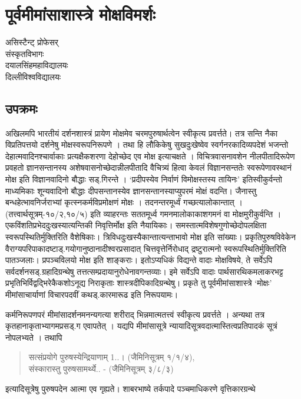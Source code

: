 \chapter{पूर्वमीमांसाशास्त्रे मोक्षविमर्शः}

\begin{center}
\smallskip

असिस्टैन्ट् प्रोफेसर्\\
संस्कृतविभागः\\
दयालसिंहमहाविद्यालयः\\
दिल्लीविश्वविद्यालयः
\addrule
\end{center}
 
\section*{उपक्रमः}

अखिलमपि भारतीयं दर्शनशास्त्रं प्रायेण मोक्षमेव चरमपुरुषार्थत्वेन स्वीकृत्य प्रवर्त्तते। तत्र सन्ति नैका विप्रतिपत्तयो दर्शनेषु मोक्षस्वरूपनिरूपणे । तथा हि लौकिकेषु सुखदुःखेष्वेव स्वर्गनरकादिव्यपदेशं भजन्तो देहात्मवादिनश्चार्वाकाः प्रत्यक्षैकशरणा देहोच्छेद एव मोक्ष इत्याचक्षते । विचित्रवासनावशेन नीलपीतादिरूपेण प्रवहतो ज्ञानसन्तानस्य अशेषवासनोच्छेदान्नीलपीतादि वैचित्र्यं हित्वा केवलं विज्ञानसन्ततेः स्वरूपेणावस्थानं मोक्ष इति विज्ञानवादिनो बौद्धाः सड्.गिरन्ते । ‘प्रदीपस्येव निर्वाणं विमोक्षस्तस्य तायिनः’ इतिस्वीकुर्वन्तो माध्यमिकाः शून्यवादिनो बौद्धाः दीपसन्तानस्येव ज्ञानसन्तानस्याप्युपरमं मोक्षं वदन्ति। जैनास्तु  बन्धहेत्भावनिर्जराभ्यां कृत्स्नकर्मविप्रमोक्षणं मोक्षः । तदनन्तरमूर्ध्वं गच्छत्यालोकान्तात् । (तत्त्वार्थसूत्रम्-१०/२,१०/५) इति व्याहरन्तः सततमूर्ध्व गमनमालोकाकाशगमनं वा मोक्षमुरीकुर्वन्ति । एकविंशतिप्रभेददुःखस्यात्यन्तिकी निवृत्तिर्मोक्ष इति नैयायिकाः। समस्तात्मविशेषगुणोच्छेदोपलक्षिता स्वरूपस्थितिर्मुक्तिरिति वैशेषिकाः। त्रिविधदुःखस्यैकान्तात्यन्ताभावो मोक्ष इति सांख्याः। प्रकृतिपुरुषविवेकेन वैराग्यपरिपाकादष्टाड्.गयोगानुष्ठानादीश्वरप्रसादात् चित्तवृत्तेर्निरोधाद् द्रष्टुरात्मनो स्वरूपस्थितिर्मुक्तिरिति पातञ्जलाः। प्रपञ्चविलयो मोक्ष इति शाङ्कराः। इतोऽप्यधिकं विद्यन्ते वादाः मोक्षविषये, ते सर्वेऽपि सर्वदर्शनसड्.ग्रहादिग्रन्थेषु तत्तत्सम्प्रदायानुरोधेनावगन्तव्याः। इमे सर्वेऽपि वादाः पार्थसारथिकमलाकरभट्ट प्रभृतिभिर्विद्वद्भिरेकैकशोऽनूद्य निराकृताः शास्त्रदीपिकादिग्रन्थेषु। प्रकृते तु पूर्वमीमांसाशास्त्रे ‘मोक्षः’ मीमांसाचार्याणां विचारपदवीं कथड्.कारमारूढ इति निरूपयामः।

कर्मनिरूपणपरं मीमांसादर्शनमनन्यगत्या शरीराद् भिन्नमात्मतत्त्वं स्वीकृत्य प्रवर्त्तते । अन्यथा तत्र कृतहानाकृताभ्यागमप्रसड्.ग एवापतेत् । यद्यपि मीमांसासूत्रे न्यायादिसूत्रवदात्मास्तित्वप्रतिपादकं सूत्रं नोपलभ्यते । तथापि 
\begin{verse}
सत्संप्रयोगे पुरुषस्येन्द्रियाणाम् 1..। (जैमिनिसूत्रम् १/­१/४), \\
संस्कारास्तु पुरुषसामर्थ्ये.. - (जैमिनिसूत्रम् ३/­८/३) 
\end{verse}
इत्यादिसूत्रेषु पुरुषपदेन आत्मा एव गृह्यते। शाबरभाष्ये तर्कपादे पञ्चमाधिकरणे वृत्तिकारग्रन्थे 


